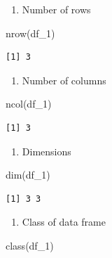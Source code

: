 \documentclass[
  letterpaper,
  DIV=11,
  numbers=noendperiod]{scrreprt}
\newenvironment{Shaded}{\begin{snugshade}}{\end{snugshade}}
\newcommand{\FunctionTok}[1]{\textcolor[rgb]{0.28,0.35,0.67}{#1}}
\newcommand{\NormalTok}[1]{\textcolor[rgb]{0.00,0.23,0.31}{#1}}
\providecommand{\tightlist}{%
  \setlength{\itemsep}{0pt}\setlength{\parskip}{0pt}}\usepackage{longtable,booktabs,array}
\begin{document}
\begin{enumerate}
\def\labelenumi{\alph{enumi}.}
\tightlist
\item
  Number of rows
\end{enumerate}

\begin{Shaded}
\begin{Highlighting}[]
\FunctionTok{nrow}\NormalTok{(df\_1)}
\end{Highlighting}
\end{Shaded}

\begin{verbatim}
[1] 3
\end{verbatim}

\begin{enumerate}
\def\labelenumi{\alph{enumi}.}
\setcounter{enumi}{1}
\tightlist
\item
  Number of columns
\end{enumerate}

\begin{Shaded}
\begin{Highlighting}[]
\FunctionTok{ncol}\NormalTok{(df\_1)}
\end{Highlighting}
\end{Shaded}

\begin{verbatim}
[1] 3
\end{verbatim}

\begin{enumerate}
\def\labelenumi{\alph{enumi}.}
\setcounter{enumi}{2}
\tightlist
\item
  Dimensions
\end{enumerate}

\begin{Shaded}
\begin{Highlighting}[]
\FunctionTok{dim}\NormalTok{(df\_1)}
\end{Highlighting}
\end{Shaded}

\begin{verbatim}
[1] 3 3
\end{verbatim}

\begin{enumerate}
\def\labelenumi{\alph{enumi}.}
\setcounter{enumi}{3}
\tightlist
\item
  Class of data frame
\end{enumerate}

\begin{Shaded}
\begin{Highlighting}[]
\FunctionTok{class}\NormalTok{(df\_1)}
\end{Highlighting}
\end{Shaded}
\end{document}
